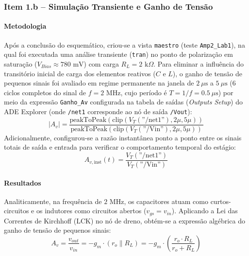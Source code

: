\subsubsection{Item 1.b -- Simulação Transiente e Ganho de Tensão}

\paragraph{Metodologia}
\vspace{0.2cm}
Após a conclusão do esquemático, criou-se a vista \texttt{maestro} (teste \texttt{Amp2\_Lab1}), na qual foi executada uma análise transiente (\texttt{tran}) no ponto de polarização em saturação ($V_{Bias} \approx 780\text{ mV}$) com carga $R_L = 2\text{ k}\Omega$. Para eliminar a influência do transitório inicial de carga dos elementos reativos ($C$ e $L$), o ganho de tensão de pequenos sinais foi avaliado em regime permanente na janela de $2\ \mu\text{s}$ a $5\ \mu\text{s}$ ($6$ ciclos completos do sinal de $f = 2\text{ MHz}$, cujo período é $T = 1/f = 0.5\ \mu\text{s}$) por meio da expressão \texttt{Ganho\_Av} configurada na tabela de saídas (\textit{Outputs Setup}) do ADE Explorer (onde \texttt{/net1} corresponde ao nó de saída \texttt{/Vout}):
\begin{equation}
    |A_v| = \frac{\text{peakToPeak}(\text{clip}(V_T(\text{''/net1''}), 2\mu, 5\mu))}{\text{peakToPeak}(\text{clip}(V_T(\text{''/Vin''}), 2\mu, 5\mu))}
\end{equation}
Adicionalmente, configurou-se a razão instantânea ponto a ponto entre os sinais totais de saída e entrada para verificar o comportamento temporal do estágio:
\begin{equation}
    A_{v,\text{inst}}(t) = \frac{V_T(\text{''/net1''})}{V_T(\text{''/Vin''})}
\end{equation}

\paragraph{Resultados}
\vspace{0.2cm}
Analiticamente, na frequência de $2\text{ MHz}$, os capacitores atuam como curtos-circuitos e os indutores como circuitos abertos ($v_{gs} = v_{in}$). Aplicando a Lei das Correntes de Kirchhoff (LCK) no nó de dreno, obtém-se a expressão algébrica do ganho de tensão de pequenos sinais:
\begin{equation}
    A_v = \frac{v_{out}}{v_{in}} = -g_m \cdot (r_o \parallel R_L) = -g_m \cdot \left(\frac{r_o \cdot R_L}{r_o + R_L}\right)
\end{equation}

